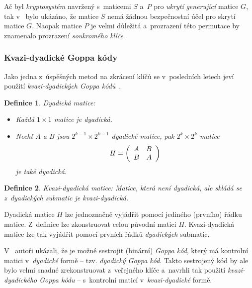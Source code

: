 \documentclass[thesis=M,czech,hidelinks]{FITthesis}[2012/06/26]
\newcommand{\0}{{\textcolor[gray]{0.75}{0}}}
\newtheorem{definice}{Definice}
\begin{document}
Ač byl \emph{kryptosystém} navržený s~maticemi $S$ a~$P$ pro \emph{ukrytí}
\emph{generující} matice $G$, tak v~\cite{Engelbert} bylo ukázáno, že matice $S$
nemá žádnou bezpečnostní účel pro skrytí matice $G$. Naopak matice $P$ je velmi
důležitá a~prozrazení této permutace by znamenalo prozrazení \emph{soukromého
klíče}.


\subsubsection{Kvazi-dyadické Goppa kódy}\label{kap_kvazi}

Jako jedna z~úspěšných metod na zkrácení klíčů se v~posledních letech jeví
použití \emph{kvazi-dyadických Goppa kódů}~\cite{Misoczki1}.

\begin{definice}{Dyadická matice:}
    \begin{itemize}
        \item Každá $1\times1$ matice je \emph{dyadická}. \\

        \item Nechť $A$ a $B$ jsou $2^{k-1}\times2^{k-1}$ \emph{dyadické}
            matice, pak
            $2^k\times2^k$ matice
            $$
                H = \left(\begin{array}{c c}
                    A & B\\
                    B & A
                \end{array}\right)
            $$
            je také \emph{dyadická}.

    \end{itemize}
\end{definice}


\begin{definice}{Kvazi-dyadická matice:}
    Matice, která není \emph{dyadická}, ale skládá se z~\emph{dyadických}
    submatic je \emph{kvazi-dyadická}.
\end{definice}

Dyadická matice $H$ lze jednoznačně vyjádřit pomocí jediného (prvního) řádku
matice. Z~definice lze zkonstruovat celou původní matici $H$. Kvazi-dyadická
matice lze tak vyjádřit pomocí prvních řádků \emph{dyadických} submatic.


V~\cite{Misoczki1} autoři ukázali, že je možné sestrojit (binární) \emph{Goppa
kód}, který má kontrolní matici v~\emph{dyadické} formě -- tzv. \emph{dyadický
Goppa kód}. Takto sestrojený kód by ale bylo velmi snadné zrekonstruovat
z~veřejného klíče a~navrhli tak použití \emph{kvazi-dyadického Goppa kódu} --
s~kontrolní maticí v~\emph{kvazi-dyadické} formě.
\end{document}
